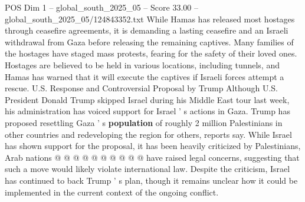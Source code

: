 \begin{textsample}{POS Dim 1 – global\_south\_2025\_05 – Score 33.00 – global\_south\_2025\_05/124843352.txt}
While Hamas has released most hostages through ceasefire agreements, it is demanding a lasting ceasefire and an Israeli withdrawal from Gaza before releasing the remaining captives.
Many families of the hostages have staged mass protests, fearing for the safety of their loved ones.
Hostages are believed to be held in various locations, including tunnels, and Hamas has warned that it will execute the captives if Israeli forces attempt a rescue.
U.S.
Response and Controversial Proposal by Trump Although U.S.
President Donald Trump skipped Israel during his Middle East tour last week, his administration has voiced support for Israel ' s actions in Gaza.
Trump has proposed resettling Gaza ' s \textbf{population} of roughly 2 million Palestinians in other countries and redeveloping the region for others, reports say.
While Israel has shown support for the proposal, it has been heavily criticized by Palestinians, Arab nations @ @ @ @ @ @ @ @ @ @ have raised legal concerns, suggesting that such a move would likely violate international law.
Despite the criticism, Israel has continued to back Trump ' s plan, though it remains unclear how it could be implemented in the current context of the ongoing conflict.

\end{textsample}
